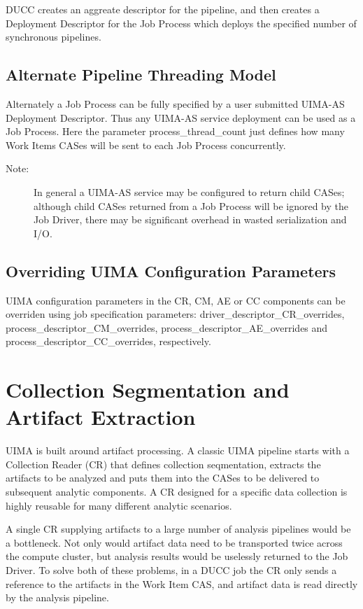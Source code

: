    DUCC creates an aggreate descriptor for the pipeline, and then creates a
   Deployment Descriptor for the Job Process which deploys the specified number
   of synchronous pipelines.
   
   \subsection{Alternate Pipeline Threading Model}
   Alternately a Job Process can be fully specified by a user submitted UIMA-AS
   Deployment Descriptor. Thus any UIMA-AS service deployment can be used as a
   Job Process. Here the parameter process\_thread\_count just defines
   how many Work Items CASes will be sent to each Job Process concurrently.
   
	\begin{description}
	    \item[Note:] In general a UIMA-AS service may be configured to
	    return child CASes; although child CASes returned from a Job Process will be
	    ignored by the Job Driver, there may be significant overhead in wasted
	    serialization and I/O.
	\end{description}

   \subsection{Overriding UIMA Configuration Parameters}
   UIMA configuration parameters in the CR, CM, AE or CC components can be overriden using
   job specification parameters: driver\_descriptor\_CR\_overrides, process\_descriptor\_CM\_overrides,
   process\_descriptor\_AE\_overrides and process\_descriptor\_CC\_overrides, respectively.

\section{Collection Segmentation and Artifact Extraction}

UIMA is built around artifact processing. A classic UIMA pipeline starts with
a Collection Reader (CR) that defines collection seqmentation, extracts the artifacts
to be analyzed and puts them into the CASes to be delivered to subsequent analytic components. 
A CR designed for a specific data collection is highly reusable
for many different analytic scenarios.

A single CR supplying artifacts to a large number of analysis pipelines 
would be a bottleneck. Not only would artifact data need to be transported twice across
the compute cluster, but analysis results would be uselessly returned to the Job Driver.
To solve both of these problems, in a DUCC job the CR only sends a reference
to the artifacts in the Work Item CAS, and artifact data is read directly by the analysis pipeline.

